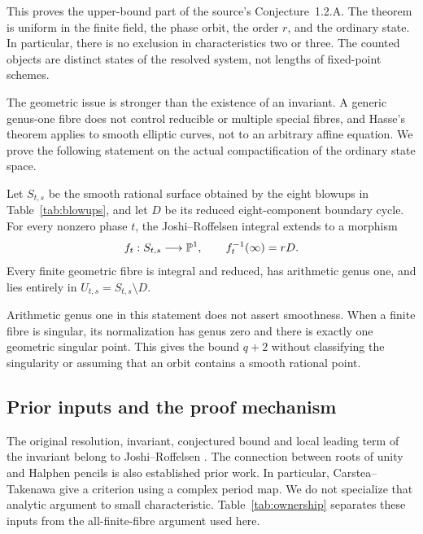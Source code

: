 This proves the upper-bound part of the source's Conjecture~1.2.A.
The theorem is uniform in the finite field, the phase orbit, the order
\(r\), and the ordinary state. In particular, there is no exclusion
in characteristics two or three. The counted objects are distinct
states of the resolved system, not lengths of fixed-point schemes.

The geometric issue is stronger than the existence of an invariant.
A generic genus-one fibre does not control reducible or multiple
special fibres, and Hasse's theorem applies to smooth elliptic curves,
not to an arbitrary affine equation. We prove the following statement
on the actual compactification of the ordinary state space.

\begin{theorem}\label{thm:fibres-intro}
Let \(S_{t,s}\) be the smooth rational surface obtained by the eight
blowups in Table~\ref{tab:blowups}, and let \(D\) be its reduced
eight-component boundary cycle. For every nonzero phase \(t\), the
Joshi--Roffelsen integral extends to a morphism
\[
f_t:S_{t,s}\longrightarrow\mathbb P^1,
\qquad f_t^{-1}(\infty)=rD.
\]
Every finite geometric fibre is integral and reduced, has arithmetic
genus one, and lies entirely in \(U_{t,s}=S_{t,s}\setminus D\).
\end{theorem}

Arithmetic genus one in this statement does not assert smoothness.
When a finite fibre is singular, its normalization has genus zero and
there is exactly one geometric singular point. This gives the bound
\(q+2\) without classifying the singularity or assuming that an orbit
contains a smooth rational point.

\subsection{Prior inputs and the proof mechanism}

The original resolution, invariant, conjectured bound and local
leading term of the invariant belong to Joshi--Roffelsen
\citep[Definitions 2.1--2.2, Algorithm 1 and Theorem 3.1]{JoshiRoffelsen2026}.
The connection between roots of unity and Halphen pencils is also
established prior work. In particular, Carstea--Takenawa
\citep[Theorem 2.2 and Remark 2.3]{CarsteaTakenawa2012} give a criterion
using a complex period map. We do not specialize that analytic argument
to small characteristic. Table~\ref{tab:ownership} separates these
inputs from the all-finite-fibre argument used here.

